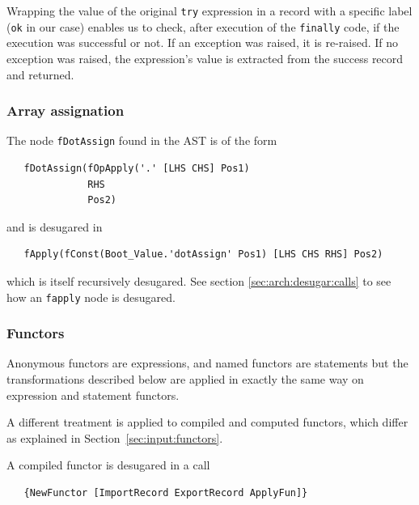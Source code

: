 \documentclass[a4paper]{memoir}
\begin{document}
Wrapping the value of the original \lstinline!try! expression in a record
with a specific label (\lstinline!ok! in our case) enables us to check, 
after execution of the \lstinline!finally! code, if the
execution was successful or not. If an exception was raised, it is re-raised. If
no exception was raised, the expression's value is extracted from the success
record and returned.



\subsubsection{Array assignation}\label{sec:arch:desugar:dotassign}
The node \lstinline!fDotAssign! found in the AST is of the form 
\begin{lstlisting}
   fDotAssign(fOpApply('.' [LHS CHS] Pos1) 
              RHS 
              Pos2) 
\end{lstlisting}
and is desugared in 
\begin{lstlisting}
   fApply(fConst(Boot_Value.'dotAssign' Pos1) [LHS CHS RHS] Pos2)
\end{lstlisting}
which is itself recursively desugared. See section \ref{sec:arch:desugar:calls}
to see how an \lstinline!fapply! node is desugared.


\subsubsection{Functors}\label{sec:arch:desugar:functors}
Anonymous functors are expressions, and named functors are
statements but the transformations described below are applied in exactly the same way
on expression and statement functors.

A different treatment is applied to compiled and computed functors, which differ
as explained in Section~\ref{sec:input:functors}.

A compiled functor is desugared in a call 
\begin{lstlisting}
   {NewFunctor [ImportRecord ExportRecord ApplyFun]}
\end{lstlisting}
\end{document}
